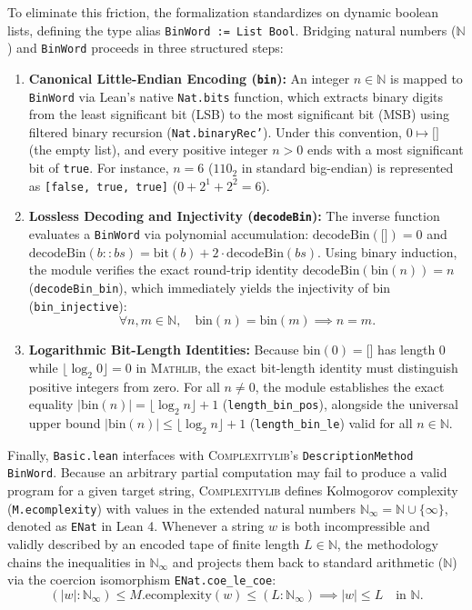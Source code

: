 \documentclass[acmsmall,natbib=false,nonacm]{acmart}
\begin{document}
To eliminate this friction, the formalization standardizes on dynamic boolean lists, defining the type alias \texttt{BinWord := List Bool}. Bridging natural numbers ($\mathbb{N}$) and \texttt{BinWord} proceeds in three structured steps:
\begin{enumerate}
    \item \textbf{Canonical Little-Endian Encoding (\texttt{bin}):} An integer $n \in \mathbb{N}$ is mapped to \texttt{BinWord} via Lean's native \texttt{Nat.bits} function, which extracts binary digits from the least significant bit (LSB) to the most significant bit (MSB) using filtered binary recursion (\texttt{Nat.binaryRec'}). Under this convention, $0 \mapsto \texttt{[]}$ (the empty list), and every positive integer $n > 0$ ends with a most significant bit of \texttt{true}. For instance, $n = 6$ ($110_2$ in standard big-endian) is represented as \texttt{[false, true, true]} ($0 + 2^1 + 2^2 = 6$).
    \item \textbf{Lossless Decoding and Injectivity (\texttt{decodeBin}):} The inverse function evaluates a \texttt{BinWord} via polynomial accumulation: $\text{decodeBin}(\texttt{[]}) = 0$ and $\text{decodeBin}(b :: bs) = \text{bit}(b) + 2 \cdot \text{decodeBin}(bs)$. Using binary induction, the module verifies the exact round-trip identity $\text{decodeBin}(\text{bin}(n)) = n$ (\texttt{decodeBin\_bin}), which immediately yields the injectivity of $\text{bin}$ (\texttt{bin\_injective}):
    \begin{equation}
        \forall n, m \in \mathbb{N}, \quad \text{bin}(n) = \text{bin}(m) \implies n = m.
    \end{equation}
    \item \textbf{Logarithmic Bit-Length Identities:} Because $\text{bin}(0) = \texttt{[]}$ has length $0$ while $\lfloor\log_2 0\rfloor = 0$ in \textsc{Mathlib}, the exact bit-length identity must distinguish positive integers from zero. For all $n \neq 0$, the module establishes the exact equality $|\text{bin}(n)| = \lfloor\log_2 n\rfloor + 1$ (\texttt{length\_bin\_pos}), alongside the universal upper bound $|\text{bin}(n)| \le \lfloor\log_2 n\rfloor + 1$ (\texttt{length\_bin\_le}) valid for all $n \in \mathbb{N}$.
\end{enumerate}

Finally, \texttt{Basic.lean} interfaces with \textsc{Complexitylib}'s \texttt{DescriptionMethod BinWord}. Because an arbitrary partial computation may fail to produce a valid program for a given target string, \textsc{Complexitylib} defines Kolmogorov complexity (\texttt{M.ecomplexity}) with values in the extended natural numbers $\mathbb{N}_\infty = \mathbb{N} \cup \{\infty\}$, denoted as \texttt{ENat} in Lean 4. Whenever a string $w$ is both incompressible and validly described by an encoded tape of finite length $L \in \mathbb{N}$, the methodology chains the inequalities in $\mathbb{N}_\infty$ and projects them back to standard arithmetic ($\mathbb{N}$) via the coercion isomorphism \texttt{ENat.coe\_le\_coe}:
\begin{equation}
    (|w| : \mathbb{N}_\infty) \le M.\text{ecomplexity}(w) \le (L : \mathbb{N}_\infty) \implies |w| \le L \quad \text{in } \mathbb{N}.
\end{equation}
\end{document}
